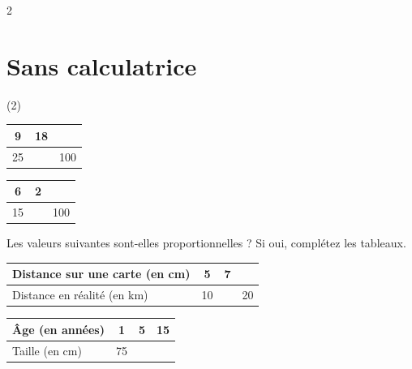 \documentclass[10pt,a4paper]{article}
\begin{document}
\begin{multicols}{2}
\section{Sans calculatrice}

\vspace{-0.5cm}\begin{exo}[][]

   
    \begin{tasks}(2)
        \task   \renewcommand{\arraystretch}{1.5}  \begin{tabular}{|*{3}{c|}}
        \hline
          9 & 18 & \\ \hline
         25 &  & 100 \\ \hline
    \end{tabular} 

    \task \renewcommand{\arraystretch}{1.5} \begin{tabular}{|*{3}{c|}}
        \hline
          6 & 2 &  \\ \hline
          15 &  & 100\\ \hline
    \end{tabular} 
    \end{tasks} 
   
\end{exo}


\begin{exo}[][appro]
    Les valeurs suivantes sont-elles proportionnelles ? Si oui, complétez les tableaux.
    \begin{tasks}
        \task     \begin{tabular}{|p{4.5cm}|*{3}{c|}}
        \hline
        Distance sur une carte (en cm) & 5 & 7 & \\ \hline
        Distance en réalité (en km) & 10 &  & 20 \\ \hline
    \end{tabular}

    \task     \begin{tabular}{|p{4.5cm}|*{3}{c|}}
        \hline
        Âge (en années) & 1 & 5 & 15 \\ \hline
        Taille (en cm) & 75 &  &  \\ \hline
    \end{tabular}


\end{tasks}
\end{exo}
\end{multicols}
\end{document}
